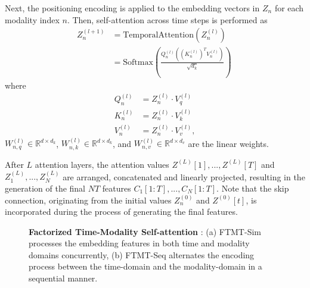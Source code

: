 Next, the positioning encoding is applied to the embedding vectors in $Z_{n}$ \cite{vaswani2017attention} for each modality index $n$.  Then, self-attention across time steps is performed as
\begin{equation}
    \begin{split}
    Z^{(l+1)}_{n} &= \mathrm{TemporalAttention}(Z^{(l)}_{n}) \\ 
    &=  \mathrm{Softmax}\left( \frac{Q_n^{(l)}((K_n^{(l)})^{T}V_n^{(l)})}{\sqrt{d_{k}}} \right)\,
    \end{split}    
\end{equation}
where 
\begin{equation}
    \begin{split}
    Q_n^{(l)} &= Z^{(l)}_{n} \cdot V^{(l)}_{q} \\
    K_n^{(l)} &= Z^{(l)}_{n} \cdot V^{(l)}_{k} \\
     V_n^{(l)} &= Z^{(l)}_{n} \cdot V^{(l)}_{v},
     \end{split}
\end{equation}
 $W^{(l)}_{n,q} \in \mathbb{R}^{d \times d_{k}}$, $W^{(l)}_{n,k} \in \mathbb{R}^{d \times d_{k}}$, and $W^{(l)}_{n,v} \in \mathbb{R}^{d \times d_{v}}$ are the linear weights.

After $L$ attention layers, the attention values $Z^{(L)}[1],..., Z^{(L)}[T]$ and $Z^{(L)}_{1},...,Z^{(L)}_{N}$ are arranged, concatenated and linearly projected, resulting in the generation of the final $NT$ features $C_{1}[1:T],...,C_{N}[1:T]$. 
Note that the skip connection, originating from the initial values $Z^{(0)}_{n}$ and $Z^{(0)}[t]$, is incorporated during the process of generating the final features. 

\begin{figure*}[tbh]
    \centering
    \captionsetup[subfloat]{labelfont=footnotesize,textfont=footnotesize}
    \quad\quad
    \caption{\textbf{Factorized Time-Modality Self-attention} : (a) FTMT-Sim processes the embedding features in both time and modality domains concurrently, (b) FTMT-Seq alternates the encoding process between the time-domain and the modality-domain in a sequential manner. }
    \label{fig2:FSC}
\end{figure*}

